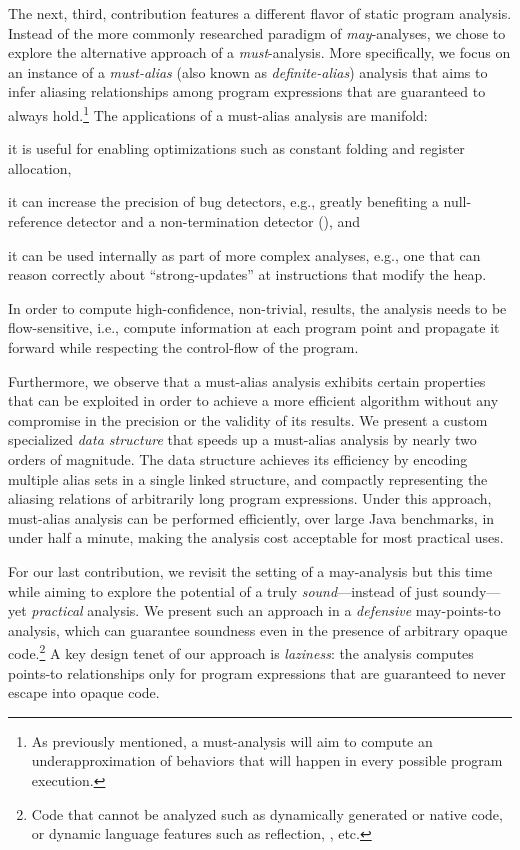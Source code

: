  The next, third, contribution features a different flavor of static program analysis. Instead of the more commonly researched paradigm of \emph{may}-analyses, we chose to explore the alternative approach of a \emph{must}-analysis. More specifically, we focus on an instance of a \emph{must-alias} (also known as \emph{definite-alias}) analysis that aims to infer aliasing relationships among program expressions that are guaranteed to always hold.\footnote{As previously mentioned, a must-analysis will aim to compute an underapproximation of behaviors that will happen in every possible program execution.} The applications of a must-alias analysis are manifold:
\begin{inparaenum}[(1)]
\item it is useful for enabling optimizations such as constant folding and
	register allocation,
\item it can increase the precision of bug detectors, e.g., greatly benefiting a
	null-reference detector and a non-termination detector (\todo{}), and
\item it can be used internally as part of more complex analyses, e.g., one that
	can reason correctly about ``strong-updates'' at instructions that modify
	the heap.
\end{inparaenum}
In order to compute high-confidence, non-trivial, results, the analysis needs to be flow-sensitive, i.e., compute information at each program point and propagate it forward while respecting the control-flow of the program.

Furthermore, we observe that a must-alias analysis exhibits certain properties that can be exploited in order to achieve a more efficient algorithm without any compromise in the precision or the validity of its results. We present a custom specialized \emph{data structure} that speeds up a must-alias analysis by nearly two orders of magnitude. The data structure achieves its efficiency by encoding multiple alias sets in a single linked structure, and compactly representing the aliasing relations of arbitrarily long program expressions. Under this approach, must-alias analysis can be performed efficiently, over large Java benchmarks, in under half a minute, making the analysis cost acceptable for most practical uses.

 For our last contribution, we revisit the setting of a may-analysis but this time while aiming to explore the potential of a truly \emph{sound}---instead of just soundy---yet \emph{practical} analysis. We present such an approach in a \emph{defensive} may-points-to analysis, which can guarantee soundness even in the presence of arbitrary opaque code.\footnote{Code that cannot be analyzed such as dynamically generated or native code, or dynamic language features such as reflection, , etc.} A key design tenet of our approach is \emph{laziness}: the analysis computes points-to relationships only for program expressions that are guaranteed to never escape into opaque code.


